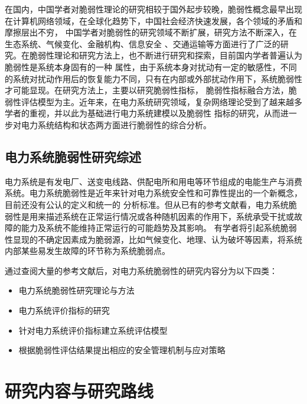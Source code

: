 在国内，中国学者对脆弱性理论的研究相较于国外起步较晚，脆弱性概念最早出现在计算机网络领域\cite{refs17}，在全球化趋势下，中国社会经济快速发展，各个领域的矛盾和摩擦层出不穷，
中国学者对脆弱性的研究领域不断扩展，研究方法不断深入，在生态系统\cite{refs18,refs19}、气候变化\cite{refs20,refs21}、金融机构\cite{refs22,refs23,refs24}、信息安全
\cite{refs25,refs26}、交通运输\cite{refs27,refs28}等方面进行了广泛的研究。在脆弱性理论和研究方法上，也不断进行研究和探索，目前国内学者普遍认为脆弱性是系统本身固有的一种
属性，由于系统本身对扰动有一定的敏感性，不同的系统对扰动作用后的恢复能力不同，只有在内部或外部扰动作用下，系统脆弱性才可能显现。在研究方法上，主要以研究脆弱性指标\cite{refs29}，
脆弱性指标融合方法\cite{refs30}，脆弱性评估模型为主。近年来，在电力系统研究领域，复杂网络理论\cite{refs31}受到了越来越多学者的重视，并以此为基础进行电力系统建模以及脆弱性
指标的研究，从而进一步对电力系统结构和状态两方面进行脆弱性的综合分析。


\subsection{电力系统脆弱性研究综述}
\label{sec:presentPowerSys}
电力系统是有发电厂、送变电线路、供配电所和用电等环节组成的电能生产与消费系统。电力系统脆弱性是近年来针对电力系统安全性和可靠性提出的一个新概念，目前还没有公认的定义和统一的
分析标准。但从已有的参考文献看，电力系统脆弱性是用来描述系统在正常运行情况或各种随机因素的作用下，系统承受干扰或故障的能力及系统不能维持正常运行的可能趋势及其影响\cite{refs32}。
有学者将引起系统脆弱性显现的不确定因素成为脆弱源，比如气候变化、地理、认为破坏等因素，将系统内部某些易发生故障的环节称为系统脆弱点。

通过查阅大量的参考文献后，对电力系统脆弱性的研究内容分为以下四类：
\begin{itemize}
  \item 电力系统脆弱性研究理论与方法
  \item 电力系统评价指标的研究
  \item 针对电力系统评价指标建立系统评估模型
  \item 根据脆弱性评估结果提出相应的安全管理机制与应对策略 
\end{itemize}



\section{研究内容与研究路线}
\label{sec:research_curise}

